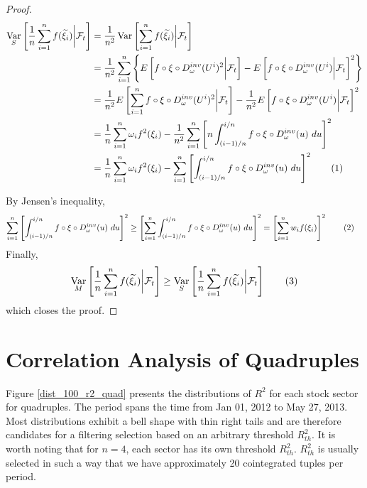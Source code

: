 \documentclass[11pt,a4,twosided,singlespacing,titlepagenumber=on]{scrreprt}
\numberwithin{equation}{chapter} %
\theoremstyle{remark}
\DeclareMathOperator{\var}{Var}
\newcommand\numberthis{\addtocounter{equation}{1}\tag{\theequation}}
\begin{document}
\begin{proof}
\begin{align*}
\var_S \left[ \frac{1}{n} \sum_{i=1}^n f(\widetilde{\xi_i}) \bigg| \mathcal{F}_t \right] &= \frac{1}{n^2} \var \left[ \sum_{i=1}^n f(\widetilde{\xi_i}) \bigg| \mathcal{F}_t \right] \\
																					  &= \frac{1}{n^2} \sum_{i=1}^n \left\{ E \left[ f \circ \xi \circ D_\omega^{inv}(U^i)^2 \bigg| \mathcal{F}_t \right] - E \left[ f \circ \xi \circ D_\omega^{inv}(U^i) \bigg| \mathcal{F}_t \right]^2 \right\}\\
																					  &= \frac{1}{n^2} E \left[ \sum_{i=1}^n f \circ \xi \circ D_\omega^{inv}(U^i)^2 \bigg| \mathcal{F}_t \right] - \frac{1}{n^2} E \left[ f \circ \xi \circ D_\omega^{inv}(U^i) \bigg| \mathcal{F}_t \right]^2 \\
																					  &= \frac{1}{n} \sum_{i=1}^n \omega_i f^2(\xi_i) - \frac{1}{n^2} \sum_{i=1}^n \left[ n \int_{(i-1)/n}^{i/n} f \circ \xi \circ D_\omega^{inv}(u)\text{ }du\right]^2 \\
																					  &= \frac{1}{n} \sum_{i=1}^n \omega_i f^2(\xi_i) - \sum_{i=1}^n \left[ \int_{(i-1)/n}^{i/n} f \circ \xi \circ D_\omega^{inv}(u)\text{ }du\right]^2 \numberthis
\end{align*}

By Jensen's inequality,
\begin{align*}
\sum_{i=1}^n \left[ \int_{(i-1)/n}^{i/n} f \circ \xi \circ D_\omega^{inv}(u)\text{ }du\right]^2 &\geq \left[\sum_{i=1}^n \int_{(i-1)/n}^{i/n} f \circ \xi \circ D_\omega^{inv}(u)\text{ }du\right]^2 = \left[ \sum_{i=1}^n w_i f(\xi_i)\right]^2 \numberthis
\end{align*}
Finally,
\begin{equation}
\var_M \left[ \frac{1}{n} \sum_{i=1}^n f(\widetilde{\xi_i}) \bigg| \mathcal{F}_t \right] \geq \var_S \left[ \frac{1}{n} \sum_{i=1}^n f(\widetilde{\xi_i}) \bigg| \mathcal{F}_t \right] \numberthis
\end{equation}
which closes the proof.
\end{proof}

\section{Correlation Analysis of Quadruples}
\label{sec:corr_analysis_quad}
Figure \ref{dist_100_r2_quad} presents the distributions of $R^2$ for each stock sector for quadruples. The period spans the time from Jan 01, 2012 to May 27, 2013. Most distributions exhibit a bell shape with thin right tails and are therefore candidates for a filtering selection based on an arbitrary threshold $R^2_{th}$. It is worth noting that for $n=4$, each sector has its own threshold $R^2_{th}$. $R^2_{th}$ is usually selected in such a way that we have approximately 20 cointegrated tuples per period.
\end{document}
